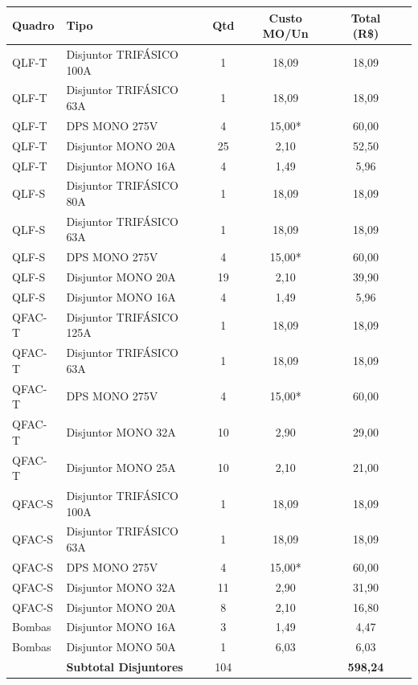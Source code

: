 \documentclass[12pt,a4paper]{article}
\renewenvironment{table}%
{\begin{center}%
\scriptsize%
\addtolength{\tabcolsep}{-2pt}%
}%
{\end{center}}
\begin{document}
\begin{table}
\centering
\begin{tabular}{lp{4.5cm}cccr}
\toprule
\textbf{Quadro} & \textbf{Tipo} & \textbf{Qtd} & \textbf{Custo MO/Un} & \textbf{Total (R\$)} \\
\midrule
QLF-T & Disjuntor TRIFÁSICO 100A & 1 & 18,09 & 18,09 \\
QLF-T & Disjuntor TRIFÁSICO 63A & 1 & 18,09 & 18,09 \\
QLF-T & DPS MONO 275V & 4 & 15,00* & 60,00 \\
QLF-T & Disjuntor MONO 20A & 25 & 2,10 & 52,50 \\
QLF-T & Disjuntor MONO 16A & 4 & 1,49 & 5,96 \\
\midrule
QLF-S & Disjuntor TRIFÁSICO 80A & 1 & 18,09 & 18,09 \\
QLF-S & Disjuntor TRIFÁSICO 63A & 1 & 18,09 & 18,09 \\
QLF-S & DPS MONO 275V & 4 & 15,00* & 60,00 \\
QLF-S & Disjuntor MONO 20A & 19 & 2,10 & 39,90 \\
QLF-S & Disjuntor MONO 16A & 4 & 1,49 & 5,96 \\
\midrule
QFAC-T & Disjuntor TRIFÁSICO 125A & 1 & 18,09 & 18,09 \\
QFAC-T & Disjuntor TRIFÁSICO 63A & 1 & 18,09 & 18,09 \\
QFAC-T & DPS MONO 275V & 4 & 15,00* & 60,00 \\
QFAC-T & Disjuntor MONO 32A & 10 & 2,90 & 29,00 \\
QFAC-T & Disjuntor MONO 25A & 10 & 2,10 & 21,00 \\
\midrule
QFAC-S & Disjuntor TRIFÁSICO 100A & 1 & 18,09 & 18,09 \\
QFAC-S & Disjuntor TRIFÁSICO 63A & 1 & 18,09 & 18,09 \\
QFAC-S & DPS MONO 275V & 4 & 15,00* & 60,00 \\
QFAC-S & Disjuntor MONO 32A & 11 & 2,90 & 31,90 \\
QFAC-S & Disjuntor MONO 20A & 8 & 2,10 & 16,80 \\
\midrule
Bombas & Disjuntor MONO 16A & 3 & 1,49 & 4,47 \\
Bombas & Disjuntor MONO 50A & 1 & 6,03 & 6,03 \\
\midrule
 & \textbf{Subtotal Disjuntores} & 104 & & \textbf{598,24} \\
\bottomrule
\end{tabular}
\end{table}
\end{document}
